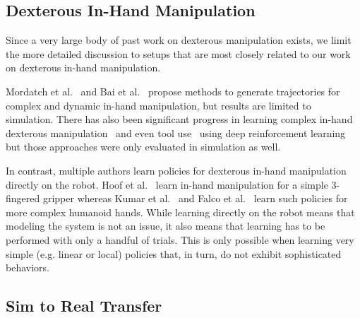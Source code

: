 \subsection{Dexterous In-Hand Manipulation}
Since a very large body of past work on dexterous manipulation exists, we limit the more detailed discussion to setups that are most closely related to our work on dexterous in-hand manipulation.

Mordatch et al.~\citep{DBLP:conf/sca/MordatchPT12} and Bai et al.~\citep{DBLP:conf/icra/BaiL14} propose methods to generate trajectories for complex and dynamic in-hand manipulation, but results are limited to simulation. %
There has also been significant progress in learning complex in-hand dexterous manipulation~\citep{plappert2018multi, DBLP:journals/corr/abs-1804-08617} and even tool use~\citep{DBLP:journals/corr/abs-1709-10087} using deep reinforcement learning but those approaches were only evaluated in simulation as well.

In contrast, multiple authors learn policies for dexterous in-hand manipulation directly on the robot.
Hoof et al.~\citep{DBLP:conf/humanoids/HoofHN015} learn in-hand manipulation for a simple 3-fingered gripper whereas Kumar et al.~\citep{DBLP:conf/icra/KumarTL16, DBLP:journals/corr/KumarGTL16} and Falco et al.~\citep{falco2018policy} learn such policies for more complex humanoid hands.
While learning directly on the robot means that modeling the system is not an issue, it also means that learning has to be performed with only a handful of trials.
This is only possible when learning very simple (e.g. linear or local) policies that, in turn, do not exhibit sophisticated behaviors. %


\subsection{Sim to Real Transfer}

